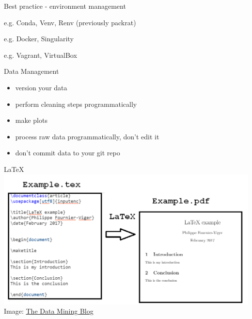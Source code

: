 \documentclass{beamer} %
\begin{document}
  \begin{frame}{Best practice - environment management}
    \begin{tcolorbox}[skin=beamer,adjusted title=Virtual environments]
      e.g. Conda, Venv, Renv (previously packrat)
    \end{tcolorbox}
    \begin{tcolorbox}[skin=beamer,adjusted title=Containers]
      e.g. Docker, Singularity
    \end{tcolorbox}
    \begin{tcolorbox}[skin=beamer,adjusted title=Virtual Machines]
      e.g. Vagrant,  VirtualBox
    \end{tcolorbox}    
  \end{frame}

  \begin{frame}[label=DATA]{Data Management}
    \begin{itemize}
      \item version your data
      \item perform cleaning steps programmatically
      \item make plots
      \item process raw data programmatically, don't edit it
      \item don't commit data to your git repo
    \end{itemize}
  \end{frame}

  \begin{frame}[label=LATEX]{\LaTeX}
    \includegraphics[width=\textwidth]{latex_example.png}
    \tiny
    Image: \href{https://data-mining.philippe-fournier-viger.com/using-latex-for-writing-research-papers/}{The Data Mining Blog}
  \end{frame}
\end{document}
